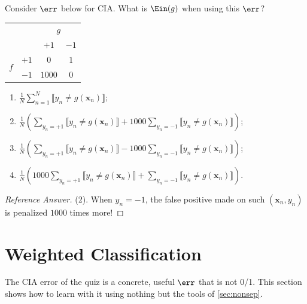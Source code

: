 \begin{exercise}
    Consider \(\err\) below for CIA. What is \(\Ein(g)\) when using this
    \(\err\)?
    \begin{center}
        \solidrules
        \begin{tabular}{@{}cc|cc@{}}
            \toprule
            & & \multicolumn{2}{c}{\(g\)}\\
            & & \(+1\) & \(-1\)\\
            \midrule
            \multirow{2}{*}{\(f\)} & \(+1\) & \(0\) & \(1\)\\
            & \(-1\) & \(1000\) & \(0\)\\
            \bottomrule
        \end{tabular}
    \end{center}
    \begin{enumerate}[(1)]
        \item \(\displaystyle \frac{1}{N} \sum_{n=1}^N \llbracket y_n \neq
            g(\bm{x}_n) \rrbracket\);
        \item \(\displaystyle \frac{1}{N} \left( \sum_{y_n = +1} \llbracket
            y_n \neq g(\bm{x}_n) \rrbracket + 1000 \sum_{y_n = -1} \llbracket
            y_n \neq g(\bm{x}_n) \rrbracket \right)\);
        \item \(\displaystyle \frac{1}{N} \left( \sum_{y_n = +1} \llbracket
            y_n \neq g(\bm{x}_n) \rrbracket - 1000 \sum_{y_n = -1} \llbracket
            y_n \neq g(\bm{x}_n) \rrbracket \right)\);
        \item \(\displaystyle \frac{1}{N} \left( 1000 \sum_{y_n = +1}
            \llbracket y_n \neq g(\bm{x}_n) \rrbracket + \sum_{y_n = -1}
            \llbracket y_n \neq g(\bm{x}_n) \rrbracket \right)\).
    \end{enumerate}
\end{exercise}

\begin{proof}[Reference Answer]
    (2). When \(y_n = -1\), the false positive made on such \((\bm{x}_n,
    y_n)\) is penalized \(1000\) times more!
\end{proof}

\section{Weighted Classification}\label{sec:weighted}


The CIA error of the quiz is a concrete, useful \(\err\) that is not 0/1. This
section shows how to learn with it using nothing but the tools of
\autoref{sec:nonsep}.


